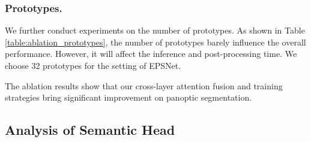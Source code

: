 \documentclass[runningheads]{llncs}
\begin{document}
\subsubsection{Prototypes.}
We further conduct experiments on the number of prototypes. As shown in Table \ref{table:ablation_prototypes}, the number of prototypes barely influence the overall performance. However, it will affect the inference and post-processing time. We choose 32 prototypes for the setting of EPSNet. 

The ablation results show that our cross-layer attention fusion and training strategies bring significant improvement on panoptic segmentation.










\subsection{Analysis of Semantic Head}
\end{document}
